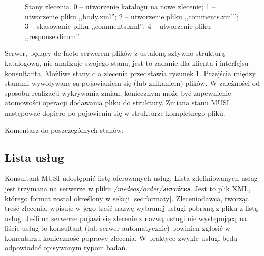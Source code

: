 \documentclass[a4paper]{article}
\begin{document}
\begin{figure}
\centering
{}
\caption[Stany zlecenia]{Stany zlecenia. 0 -- utworzenie katalogu na nowe
zlecenie; 1 -- utworzenie pliku ,,body.xml''; 2 -- utworzenie pliku ,,comments.xml''; 3 --
skasowanie pliku ,,comments.xml''; 4 -- utworzenie pliku ,,response.dicom''.}
\label{fig:stany_zlec}
\end{figure}

Serwer, będący de facto serwerem plików z ustaloną sztywno strukturą katalogową, nie
analizuje swojego stanu, jest to zadanie dla klienta i interfejsu konsultanta. Możliwe
stany dla zlecenia przedstawia rysunek \ref{fig:stany_zlec}. Przejścia między stanami
wywoływane są pojawianiem się (lub znikaniem) plików. W zależności od sposobu realizacji
wykrywania zmian, koniecznym może być zapewnienie atomowości operacji dodawania pliku
do struktury. Zmiana stanu MUSI następować dopiero po pojawieniu się w strukturze
kompletnego pliku.

Komentarz do poszczególnych stanów:

\subsection{Lista usług}

Konsultant MUSI udostępnić listę oferowanych usług. Lista zdefiniowanych usług jest
trzymana na serwerze w pliku \textit{/medeos/order/\textbf{services}}. Jest to plik XML,
którego format został określony w sekcji \ref{sec:formaty}. Zleceniodawca, tworząc treść
zlecenia, wpisuje w jego treść nazwę wybranej usługi pobraną z pliku z listą usług. Jeśli
na serwerze pojawi się zlecenie z nazwą usługi nie występującą na liście usług to
konsultant (lub serwer automatycznie) powinien zgłosić w komentarzu konieczność poprawy
zlecenia. W praktyce zwykle usługi będą odpowiadać opisywanym typom badań.
\end{document}
